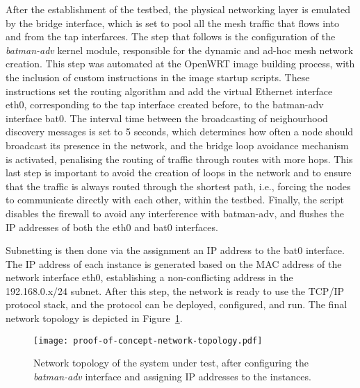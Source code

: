 After the establishment of the testbed, the physical networking layer is emulated by the bridge interface, which is set to pool all the mesh traffic that flows into and from the tap interfarces. The step that follows is the configuration of the \emph{batman-adv} kernel module, responsible for the dynamic and ad-hoc mesh network creation. This step was automated at the OpenWRT image building process, with the inclusion of custom instructions in the image startup scripts. These instructions set the routing algorithm and add the virtual Ethernet interface eth0, corresponding to the tap interface created before, to the batman-adv interface bat0. The interval time between the broadcasting of neighourhood discovery messages is set to 5 seconds, which determines how often a node should broadcast its presence in the network, and the bridge loop avoidance mechanism is activated, penalising the routing of traffic through routes with more hops. This last step is important to avoid the creation of loops in the network and to ensure that the traffic is always routed through the shortest path, i.e., forcing the nodes to communicate directly with each other, within the testbed. Finally, the script disables the firewall to avoid any interference with batman-adv, and flushes the IP addresses of both the eth0 and bat0 interfaces.

Subnetting is then done via the assignment an IP address to the bat0 interface. The IP address of each instance is generated based on the MAC address of the network interface eth0, establishing a non-conflicting address in the 192.168.0.x/24 subnet. After this step, the network is ready to use the TCP/IP protocol stack, and the \pol{} protocol can be deployed, configured, and run. The final network topology is depicted in Figure~\ref{fig:infrastructure:network-architecture}.

\begin{figure}[h!]
    \begin{center}
    \texttt{[image: proof-of-concept-network-topology.pdf]}
    \caption{Network topology of the system under test, after configuring the \emph{batman-adv} interface and assigning IP addresses to the instances.}
    \label{fig:infrastructure:network-architecture}
    \end{center}
\end{figure}